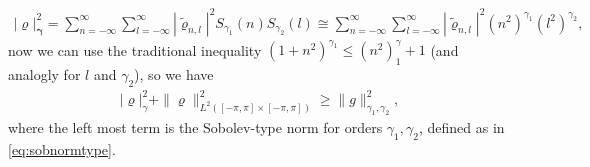 \documentclass{article}
\begin{document}
\begin{align}
\label{eq:smnormeq}
|\varrho |_{\mathbf{\gamma}}^2 = \sum_{n=-\infty}^\infty \sum_{l=-\infty}^{\infty} |\widetilde{\varrho}_{n,l}|^2 S_{\gamma_1}(n) S_{\gamma_2}(l) \cong \sum_{n=-\infty}^\infty \sum_{l=-\infty}^{\infty} |\widetilde{\varrho}_{n,l}|^2 (n^2)^{\gamma_1} (l^2)^{\gamma_2},
\end{align}
 now we can use the traditional inequality  $(1+n^2)^{\gamma_1}  \leq (n^2)^\gamma_1 +1$ (and analogly for $l$ and $\gamma_2$), so we have 
 \begin{align*}
 |\varrho|^2_{\gamma} + \| \varrho\|^2_{L^2([-\pi,\pi]\times [-\pi,\pi])} \geq  \|g\|_{\gamma_1,\gamma_2}^2,
 \end{align*}
 where the left most term is the Sobolev-type norm for orders $\gamma_1,\gamma_2$, defined as in \eqref{eq:sobnormtype}.
\end{document}
